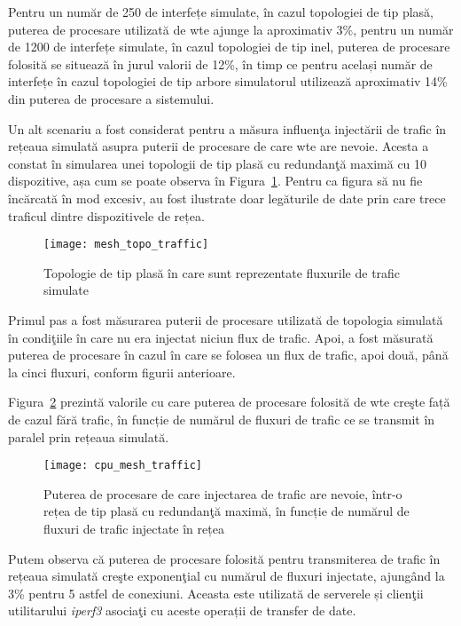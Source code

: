 Pentru un număr de 250 de interfețe simulate, în cazul topologiei de tip plasă, puterea de procesare utilizată de \gls{wte} ajunge la aproximativ 3\%, pentru un număr de 1200 de interfețe simulate, în cazul topologiei de tip inel, puterea de procesare folosită se situează în jurul valorii de 12\%, în timp ce pentru același număr de interfețe în cazul topologiei de tip arbore simulatorul utilizează aproximativ 14\% din puterea de procesare a sistemului.

Un alt scenariu a fost considerat pentru a măsura influenţa injectării de trafic în rețeaua simulată asupra puterii de procesare de care \gls{wte} are nevoie. Acesta a constat în simularea unei topologii de tip plasă cu redundanţă maximă cu 10 dispozitive, așa cum se poate observa în Figura~\ref{fig:mesh_topo_traffic}. Pentru ca figura să nu fie încărcată în mod excesiv, au fost ilustrate doar legăturile de date prin care trece traficul dintre dispozitivele de rețea.

\begin{figure}[hp]
	\centering
	\texttt{[image: mesh\_topo\_traffic]}
	\caption{Topologie de tip plasă în care sunt reprezentate fluxurile de trafic simulate}
	\label{fig:mesh_topo_traffic}
\end{figure}

Primul pas a fost măsurarea puterii de procesare utilizată de topologia simulată în condiţiile în care nu era injectat niciun flux de trafic. Apoi, a fost măsurată puterea de procesare în cazul în care se folosea un flux de trafic, apoi două, până la cinci fluxuri, conform figurii anterioare.

Figura~\ref{fig:cpu_mesh_traffic} prezintă valorile cu care puterea de procesare folosită de \gls{wte} creşte față de cazul fără trafic, în funcție de numărul de fluxuri de trafic ce se transmit în paralel prin rețeaua simulată.

\begin{figure}[hp]
	\centering
	\texttt{[image: cpu\_mesh\_traffic]}
	\caption{Puterea de procesare de care injectarea de trafic are nevoie, într-o rețea de tip plasă cu redundanţă maximă, în funcție de numărul de fluxuri de trafic injectate în rețea}
	\label{fig:cpu_mesh_traffic}
\end{figure}

Putem observa că puterea de procesare folosită pentru transmiterea de trafic în rețeaua simulată creşte exponenţial cu numărul de fluxuri injectate, ajungând la 3\% pentru 5 astfel de conexiuni. Aceasta este utilizată de serverele și clienţii utilitarului \textit{iperf3} asociaţi cu aceste operații de transfer de date.

